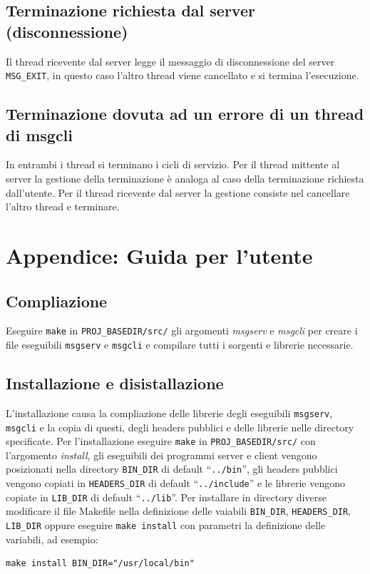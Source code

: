 \documentclass[a4paper,10pt]{article}
\begin{document}
\subsection*{Terminazione richiesta dal server (disconnessione)}
Il thread ricevente dal server legge il messaggio di disconnessione
del server \texttt{MSG\_EXIT}, in questo caso l'altro thread viene
cancellato e si termina l'esecuzione.

\subsection*{Terminazione dovuta ad un errore di un thread di msgcli}
In entrambi i thread si terminano i cicli di servizio. Per il thread
mittente al server la gestione della terminazione \`e analoga al caso
della terminazione richiesta dall'utente. Per il thread ricevente dal
server la gestione consiste nel cancellare l'altro thread e terminare.

\appendix
\section{Appendice: Guida per l'utente}

\subsection{Compliazione}
Eseguire \texttt{make} in \verb+PROJ_BASEDIR/src/+ gli argomenti
\emph{msgserv} e \emph{msgcli} per creare i file eseguibili
\texttt{msgserv} e \texttt{msgcli} e compilare tutti i sorgenti e
librerie necessarie.

\subsection{Installazione e disistallazione}
L'installazione causa la compliazione delle librerie degli eseguibili
\texttt{msgserv}, \texttt{msgcli} e la copia di questi, degli headers
pubblici e delle librerie nelle directory specificate. Per
l'installazione eseguire \texttt{make} in \verb+PROJ_BASEDIR/src/+
con l'argomento \emph{install}, gli eseguibili dei programmi server e
client vengono posizionati nella directory \verb+BIN_DIR+ di default
``\verb+../bin+'', gli headers pubblici vengono copiati in
\verb+HEADERS_DIR+ di default ``\verb+../include+'' e le librerie
vengono copiate in \verb+LIB_DIR+ di default ``\verb+../lib+''. Per
installare in directory diverse modificare il file Makefile nella
definizione delle vaiabili \verb+BIN_DIR+, \verb+HEADERS_DIR+,
\verb+LIB_DIR+ oppure eseguire \texttt{make install} con parametri la
definizione delle variabili, ad esempio:
\begin{verbatim}
make install BIN_DIR="/usr/local/bin" 
\end{verbatim}
\end{document}
